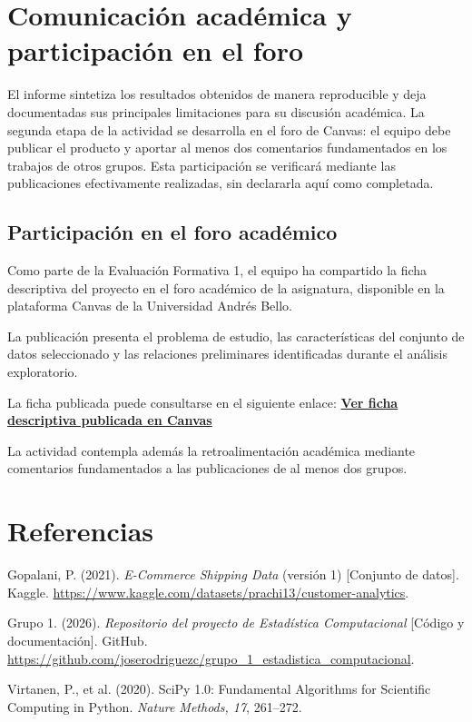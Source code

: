 \documentclass[11pt,a4paper]{article}
\begin{document}
\section{Comunicación académica y participación en el foro}
El informe sintetiza los resultados obtenidos de manera reproducible y deja documentadas sus principales limitaciones para su discusión académica. La segunda etapa de la actividad se desarrolla en el foro de Canvas: el equipo debe publicar el producto y aportar al menos dos comentarios fundamentados en los trabajos de otros grupos. Esta participación se verificará mediante las publicaciones efectivamente realizadas, sin declararla aquí como completada.

\subsection{Participación en el foro académico}

Como parte de la Evaluación Formativa 1, el equipo ha
compartido la ficha descriptiva del proyecto en el foro
académico de la asignatura, disponible en la plataforma
Canvas de la Universidad Andrés Bello.

La publicación presenta el problema de estudio, las
características del conjunto de datos seleccionado y
las relaciones preliminares identificadas durante
el análisis exploratorio.

La ficha publicada puede consultarse en el siguiente enlace: \href{https://canvas.unab.cl/courses/239151/discussion_topics/1737063?entry_id=1159590}
{\textcolor{azul}{\textbf{Ver ficha descriptiva publicada en Canvas}}}

La actividad contempla además la retroalimentación
académica mediante comentarios fundamentados a las
publicaciones de al menos dos grupos.

\section*{Referencias}
Gopalani, P. (2021). \emph{E-Commerce Shipping Data} (versión 1) [Conjunto de datos]. Kaggle. \url{https://www.kaggle.com/datasets/prachi13/customer-analytics}.

Grupo 1. (2026). \emph{Repositorio del proyecto de Estadística Computacional} [Código y documentación]. GitHub. \url{https://github.com/joserodriguezc/grupo_1_estadistica_computacional}.

Virtanen, P., et al. (2020). SciPy 1.0: Fundamental Algorithms for Scientific Computing in Python. \emph{Nature Methods, 17}, 261--272.
\end{document}
